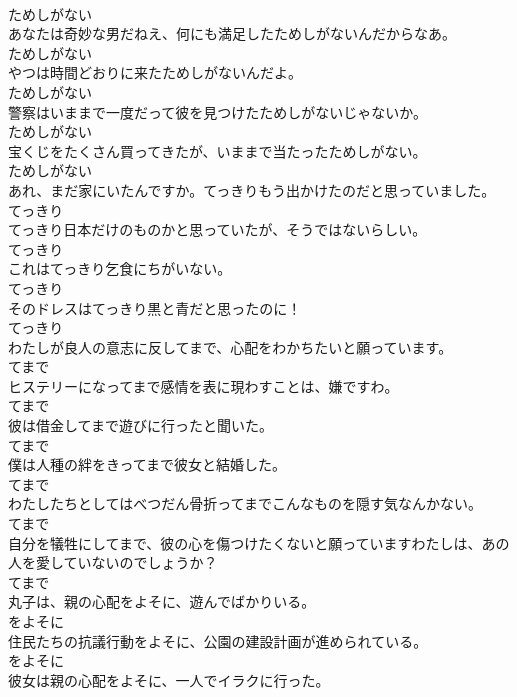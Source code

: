 \documentclass[8pt]{extreport}
\begin{document}
\begin{CJK}{UTF8}{min}
\\	ためしがない	
\\	あなたは奇妙な男だねえ、何にも満足したためしがないんだからなあ。	
\\	ためしがない	
\\	やつは時間どおりに来たためしがないんだよ。	
\\	ためしがない	
\\	警察はいままで一度だって彼を見つけたためしがないじゃないか。	
\\	ためしがない	
\\	宝くじをたくさん買ってきたが、いままで当たったためしがない。	
\\	ためしがない	
\\	あれ、まだ家にいたんですか。てっきりもう出かけたのだと思っていました。	
\\	てっきり	
\\	てっきり日本だけのものかと思っていたが、そうではないらしい。	
\\	てっきり	
\\	これはてっきり乞食にちがいない。	
\\	てっきり	
\\	そのドレスはてっきり黒と青だと思ったのに！	
\\	てっきり	
\\	わたしが良人の意志に反してまで、心配をわかちたいと願っています。	
\\	てまで	
\\	ヒステリーになってまで感情を表に現わすことは、嫌ですわ。	
\\	てまで	
\\	彼は借金してまで遊びに行ったと聞いた。	
\\	てまで	
\\	僕は人種の絆をきってまで彼女と結婚した。	
\\	てまで	
\\	わたしたちとしてはべつだん骨折ってまでこんなものを隠す気なんかない。	
\\	てまで	
\\	自分を犠牲にしてまで、彼の心を傷つけたくないと願っていますわたしは、あの人を愛していないのでしょうか？	
\\	てまで	
\\	丸子は、親の心配をよそに、遊んでばかりいる。	
\\	をよそに	
\\	住民たちの抗議行動をよそに、公園の建設計画が進められている。	
\\	をよそに	
\\	彼女は親の心配をよそに、一人でイラクに行った。	

\end{CJK}
\end{document}
